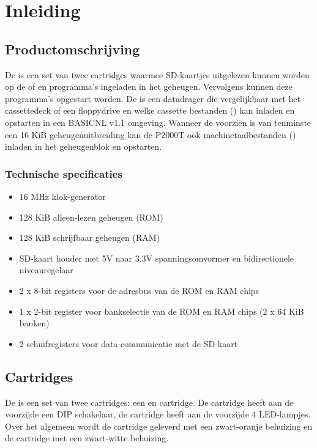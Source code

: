\chapter{Inleiding}
\chapterpreamble

%
%
%
\section{Productomschrijving}

De \product is een set van twee cartridges waarmee SD-kaartjes uitgelezen kunnen worden op de  of  en programma's ingeladen in het geheugen. Vervolgens kunnen deze programma's opgestart worden. De \product is een datadrager die vergelijkbaar met het cassettedeck of een floppydrive en welke cassette bestanden (\cas) kan inladen en opstarten in een BASICNL v1.1 omgeving. Wanneer de  voorzien is van tenminste een 16 KiB geheugenuitbreiding kan de P2000T ook machinetaalbestanden (\prg) inladen in het geheugenblok  en opstarten.

%
%
\subsection{Technische specificaties}

\begin{itemize}[noitemsep]
    \item 16 MHz klok-generator
    \item 128 KiB alleen-lezen geheugen (ROM)
    \item 128 KiB schrijfbaar geheugen (RAM)
    \item SD-kaart houder met 5V naar 3.3V spanningsomvormer en bidirectionele niveauregelaar
    \item 2 x 8-bit registers voor de adresbus van de ROM en RAM chips
    \item 1 x 2-bit register voor bankselectie van de ROM en RAM chips (2 x 64 KiB banken)
    \item 2 schuifregisters voor data-communicatie met de SD-kaart
\end{itemize}

%
%
%
\section{Cartridges}

De \product is een set van twee cartridges: een  en  cartridge. De  cartridge heeft aan de voorzijde een DIP schakelaar, de  cartridge heeft aan de voorzijde 4 LED-lampjes. Over het algemeen wordt de  cartridge geleverd met een zwart-oranje behuizing en de  cartridge met een zwart-witte behuizing.

